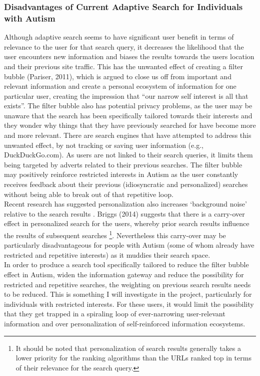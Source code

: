 \documentclass[10pt]{article}
\begin{document}
\subsubsection{Disadvantages of Current Adaptive Search for Individuals with Autism}
Although adaptive search seems to have significant user benefit in terms of relevance to the user for that search query, it decreases the likelihood that the user encounters new information and biases the results towards the users location and their previous site traffic.  This has the unwanted effect of creating a filter bubble (Pariser, 2011), which is argued to close us off from important and relevant information and create a personal ecosystem of information for one particular user, creating the impression that “our narrow self interest is all that exists”. The filter bubble also has potential privacy problems, as the user may be unaware that the search has been specifically tailored towards their interests and they wonder why things that they have previously searched for have become more and more relevant. There are search engines that have attempted to address this unwanted effect, by not tracking or saving user information (e.g., DuckDuckGo.com). As users are not linked to their search queries, it limits them being targeted by adverts related to their previous searches. The filter bubble may positively reinforce restricted interests in Autism as the user constantly receives feedback about their previous (idiosyncratic and personalized) searches without being able to break out of that repetitive loop. \\Recent research has suggested personalization also increases ‘background noise’ relative to the search results \cite{briggs}. Briggs (2014) suggests that there is a carry-over effect in personalized search for the users, whereby prior search results influence the results of subsequent searches \footnote{It should be noted that personalization of search results generally takes a lower priority for the ranking algorithms than the URLs ranked top in terms of their relevance for the search query.}.  Nevertheless this carry-over may be particularly disadvantageous for people with Autism (some of whom already have restricted and repetitive interests) as it muddies their search space.\\
In order to produce a search tool specifically tailored to reduce the filter bubble effect in Autism, widen the information gateway and reduce the possibility for restricted and repetitive searches, the weighting on previous search results needs to be reduced. This is something I will investigate in the project, particularly for individuals with restricted interests. For these users, it would limit the possibility that they get trapped in a spiraling loop of ever-narrowing user-relevant information and over personalization of self-reinforced information ecosystems.
\end{document}
